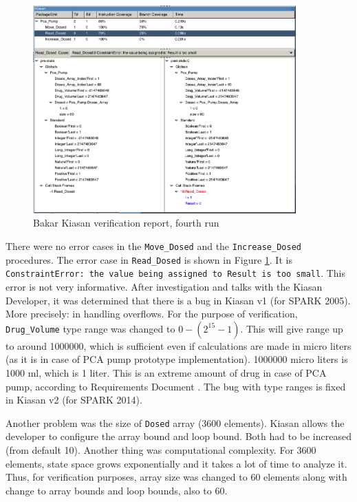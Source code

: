 \begin{figure}[ht]%
    \begin{center}
        \includegraphics[width=0.9\textwidth]{figures/pca-pump-verification-step4.png}
    \end{center}
    \caption{Bakar Kiasan verification report, fourth run}
    \label{figure:sparkverification:kiasanreport4}
\end{figure}

There were no error cases in the \lstinline{Move_Dosed} and the \lstinline{Increase_Dosed} procedures. The error case in \lstinline{Read_Dosed} is shown in Figure \ref{figure:sparkverification:kiasanreport4}. It is \lstinline{ConstraintError: the value being assigned to Result is too small}. This error is not very informative. After investigation and talks with the Kiasan Developer, it was determined that there is a bug in Kiasan v1 (for SPARK 2005). More precisely: in handling overflows. For the purpose of verification, \lstinline{Drug_Volume} type range was changed to $0 - (2^{15} - 1)$. This will give range up to around 1000000, which is sufficient even if calculations are made in micro liters (as it is in case of PCA pump prototype implementation). 1000000 micro liters is 1000 ml, which is 1 liter. This is an extreme amount of drug in case of PCA pump, according to Requirements Document \cite{PcaReq}. The bug with type ranges is fixed in Kiasan v2 (for SPARK 2014).

Another problem was the size of \lstinline{Dosed} array (3600 elements). Kiasan allows the developer to configure the array bound and loop bound. Both had to be increased (from default 10). Another thing was computational complexity. For 3600 elements, state space grows exponentially and it takes a lot of time to analyze it. Thus, for verification purposes, array size was changed to 60 elements along with change to array bounds and loop bounds, also to 60.

